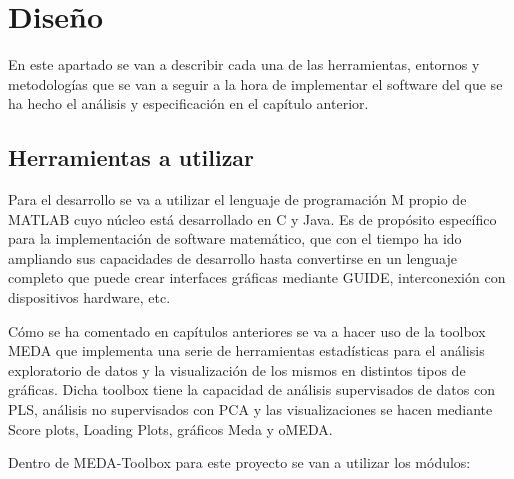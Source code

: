 \chapter{Diseño}

En este apartado se van a describir cada una de las herramientas, entornos y metodologías que se van a seguir a la hora de implementar el software del que se ha hecho el análisis y especificación en el capítulo anterior.
\bigskip

\section{Herramientas a utilizar}

Para el desarrollo se va a utilizar el lenguaje de programación M propio de MATLAB cuyo núcleo está desarrollado en C y Java. Es de propósito específico para la implementación de software matemático, que con el tiempo ha ido ampliando sus capacidades de desarrollo hasta convertirse en un lenguaje completo que puede crear interfaces gráficas mediante GUIDE, interconexión con dispositivos hardware, etc.
\bigskip

Cómo se ha comentado en capítulos anteriores se va a hacer uso de la toolbox MEDA que implementa una serie de herramientas estadísticas para el análisis exploratorio de datos y la visualización de los mismos en distintos tipos de gráficas. Dicha toolbox tiene la capacidad de análisis supervisados de datos con PLS, análisis no supervisados con PCA y las visualizaciones se hacen mediante Score plots, Loading Plots, gráficos Meda y oMEDA.
\bigskip

Dentro de MEDA-Toolbox para este proyecto se van a utilizar los módulos:
\bigskip


